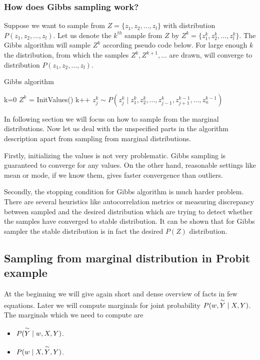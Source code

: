 \subsubsection*{How does Gibbs sampling work?}
Suppose we want to sample from $Z = \{z_1, z_2, \ldots, z_l\}$ with distribution $P(z_1, z_2, \ldots, z_l)$. Let us denote the $k^{th}$ sample from $Z$ by $Z^k = \{z_1^k, z_2^k, \ldots, z_l^k\}$. The Gibbs algorithm will sample $Z^k$ according pseudo code below. For large enough $k$ the distribution, from which the samples $Z^k, Z^{k+1}, \ldots $ are drawn, will converge to distribution $P(z_1, z_2, \ldots, z_l)$. 


\begin{algorithm}
\caption{Gibbs algorithm} \label{gibbs_pseudo}
\begin{algorithmic}
\State k=0
\State $Z^k$ = InitValues()
    \State  k++
        \State $z_j^k \sim P(z_j^k  \mid z_1^k,z_2^k, \ldots, z_{j-1}^k, z_{j+1}^{k-1}, \ldots, z_{n}^{k-1})$
    \EndFor
\EndWhile
\end{algorithmic}
\end{algorithm}

In following section we will focus on how to sample from the marginal distributions. Now let us deal with the unspecified parts in the algorithm description apart from sampling from marginal distributions.

Firstly, initializing the values is not very problematic. Gibbs sampling is guaranteed to converge for any values. On the other hand, reasonable settings like mean or mode, if we know them,  gives faster convergence than outliers. \cite{gibbs_intro}

Secondly, the stopping condition for Gibbs algorithm is much harder problem. There are several heuristics like autocorrelation metrics or measuring discrepancy between sampled and the desired distribution which are trying to detect whether the samples have converged to stable distribution. It can be shown that for Gibbs sampler the stable distribution is in fact the desired $P(Z)$ distribution. \cite{explaining_gibbs}


\subsection{Sampling from marginal distribution in Probit example} 
\label{sec:sampling_from_marginal_distribution_in_probit_example}
At the beginning we will give again short and dense overview of facts in few equations. Later we will compute marginals for joint probability $P(w, \overset{\sim}{Y} \mid X, Y)$. The marginals which we need to compute are 
\begin{itemize}
    \item $P(\overset{\sim}{Y} \mid w, X, Y)$.
    \item $P(w \mid X, \overset{\sim}{Y}, Y)$.
\end{itemize}

